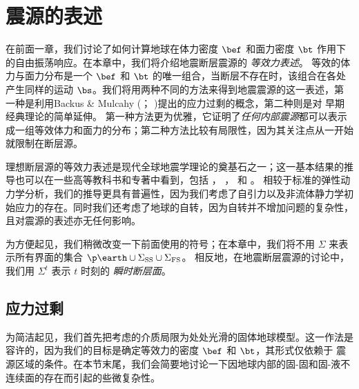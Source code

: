 \chapter{震源的表述}

在前面一章，我们讨论了如何计算地球在体力密度 $\bef$ 和面力密度 $\bt$ 作用下的自由振荡响应。在本章中，我们将介绍地震断层震源的
{\em 等效力表述\/}。
%
%
等效的体力与面力分布是一个 $\bef$ 和 $\bt$ 的唯一组合，当断层不存在时，该组合在各处产生同样的运动
$\bs$。我们将用两种不同的方法来得到地震震源的这一表述，第一种是利用Backus \& Mulcahy (\citeyear{backus&mulcahy76a}；
\citeyear{backus&mulcahy76b})提出的应力过剩的概念，第二种则是对 \textcite{burridge&knopoff64} 早期经典理论的简单延伸。
第一种方法更为优雅，它证明了{\em 任何内部震源\/}都可以表示成一组等效体力和面力的分布；第二种方法比较有局限性，因为其关注点从一开始就限制在断层源。

\enlargethispage{-0.5\baselineskip}

理想断层源的等效力表述是现代全球地震学理论的奠基石之一；这一基本结果的推导也可以在一些高等教科书和专著中看到，包括 \textcite{aki&richards80}， \textcite{ben-menahem&singh81}，
\textcite{kennett83} 和 \textcite{kostrov&das88}。
相较于标准的弹性动力学分析，我们的推导更具有普遍性，因为我们考虑了自引力以及非流体静力学初始应力的存在。同时我们还考虑了地球的自转，因为自转并不增加问题的复杂性，且对震源的表述亦无任何影响。

为方便起见，我们稍微改变一下前面使用的符号；在本章中，我们将不用 $\Sigma$ 来表示所有界面的集合
$\p\earth\cup\Sigma_{\rm SS}\cup\Sigma_{\rm FS}$。
相反地，在地震断层震源的讨论中，我们用
$\Sigma^t$ 表示 $t$ 时刻的
{\em 瞬时断层面\/}。
%

\section{应力过剩}
%
\label{5.sec.glut}

为简洁起见，我们首先把考虑的介质局限为处处光滑的固体地球模型。这一作法是容许的，因为我们的目标是确定等效力的密度 $\bef$ 和 $\bt$，其形式仅依赖于
震源区域的条件。在本节末尾，我们会简要地讨论一下因地球内部的固-固和固-液不连续面的存在而引起的些微复杂性。
%
%
%
%

